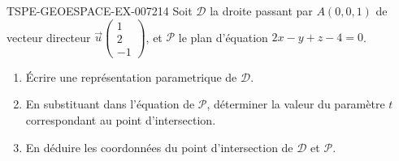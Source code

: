 \begin{exercice}{TSPE-GEOESPACE-EX-007}{2}{14}
Soit $\mathcal{D}$ la droite passant par $A(0,0,1)$ de vecteur directeur $\vec{u}\begin{pmatrix}1\\2\\-1\end{pmatrix}$, et $\mathcal{P}$ le plan d'équation $2x-y+z-4=0$.
\begin{enumerate}
  \item Écrire une représentation parametrique de $\mathcal{D}$.
  \item En substituant dans l'équation de $\mathcal{P}$, déterminer la valeur du paramètre $t$ correspondant au point d'intersection.
  \item En déduire les coordonnées du point d'intersection de $\mathcal{D}$ et $\mathcal{P}$.
\end{enumerate}
\end{exercice}
